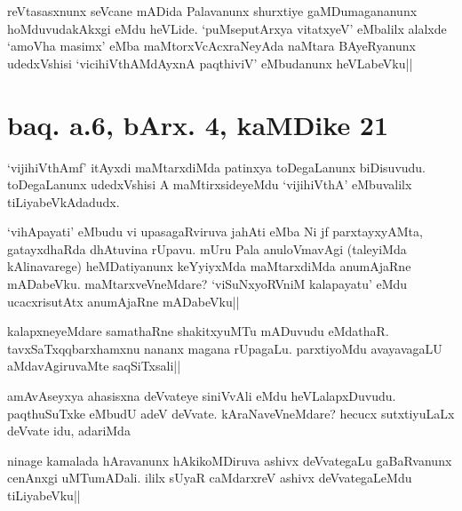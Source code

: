 \begin{artha}
reVtasasxnunx seVcane mADida Palavanunx shurxtiye gaMDumagananunx 
hoMduvudakAkxgi eMdu heVLide. `puMseputArxya vitatxyeV' eMbalilx 
alalxde `amoV\s ha masimx' eMba maMtorxVcAcxraNeyAda naMtara 
BAyeRyanunx udedxVshisi `vicihiVthAMdAyxnA paqthiviV' eMbudanunx 
heVLabeVku||
\end{artha}

\section*{baq. a.6, bArx. 4, kaMDike 21}

\stext


\begin{artha}
`vijihiVthAmf' itAyxdi maMtarxdiMda patinxya toDegaLanunx biDisuvudu. 
toDegaLanunx udedxVshisi A maMtirxsideyeMdu `vijihiVthA' eMbuvalilx 
tiLiyabeVkAdadudx.
\end{artha}


\begin{artha}
`vihApayati' eMbudu vi upasagaRviruva jahAti eMba Ni jf parxtayxyAMta, 
gatayxdhaRda dhAtuvina rUpavu. mUru Pala anuloVmavAgi (taleyiMda 
kAlinavarege) heMDatiyanunx keYyiyxMda maMtarxdiMda anumAjaRne 
mADabeVku. maMtarxveVneMdare? `viSuNxyoRVniM kalapayatu' eMdu 
ucacxrisutAtx anumAjaRne mADabeVku||
\end{artha}


\begin{artha}
kalapxneyeMdare samathaRne shakitxyuMTu mADuvudu eMdathaR. 
tavxSaTxqqbarxhamxnu nananx magana rUpagaLu. parxtiyoMdu avayavagaLU 
aMdavAgiruvaMte saqSiTxsali||
\end{artha}


\begin{artha}
amAvAseyxya ahasisxna deVvateye siniVvAli eMdu heVLalapxDuvudu. 
paqthuSuTxke eMbudU adeV deVvate. kAraNaveVneMdare? hecucx 
sutxtiyuLaLx deVvate idu, adariMda
\end{artha}

\begin{artha}
ninage kamalada hAravanunx hAkikoMDiruva ashivx deVvategaLu 
gaBaRvanunx cenAnxgi uMTumADali. ililx sUyaR caMdarxreV ashivx 
deVvategaLeMdu tiLiyabeVku|| 
\end{artha}

